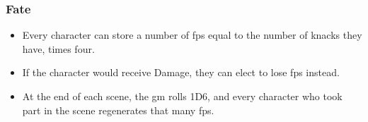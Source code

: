 \subsubsection*{Fate}
\begin{itemize}
  \item
  Every character can store a number of \glspl{fp} equal to the number of knacks they have, times four.
  \item
  If the character would receive Damage, they can elect to lose \glspl{fp} instead.
  \item
  At the end of each scene, the \gls{gm} rolls 1D6, and every character who took part in the scene regenerates that many \glspl{fp}.
\end{itemize}
